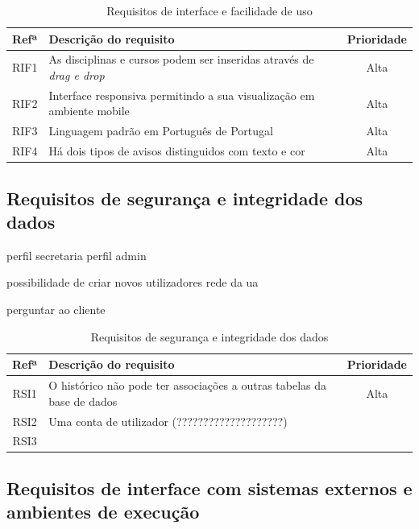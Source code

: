 \documentclass[11pt, twoside]{report}
\begin{document}
	
	\begin{table}[H]
		\caption{Requisitos de interface e facilidade de uso}
	
		\begin{center}
		\begin{tabularx}{\textwidth}{|c|X|c|}
			\hline
			\textbf{Refª }	& \textbf{Descrição do requisito} & \textbf{Prioridade} \\
			\hline
			RIF1 & As disciplinas e cursos podem ser inseridas através de \textit{drag e drop} &Alta\\
			\hline
			RIF2 & Interface responsiva permitindo a sua visualização em ambiente mobile &Alta\\
			\hline
			RIF3 & Linguagem padrão em Português de Portugal &Alta\\
			\hline
			RIF4 & Há dois tipos de avisos distinguidos com texto e cor &Alta\\
			\hline
		\end{tabularx}
		\label{requisitosdeinterface}
	\end{center}
\end{table}
	\subsection{Requisitos de segurança e integridade dos dados}
	
	perfil secretaria 
	perfil admin
	
	possibilidade de criar novos utilizadores
	rede da ua
	
	perguntar ao cliente
	\begin{table}[H]	
		\caption{Requisitos de segurança e integridade dos dados}
		
	
	\begin{center}
	\begin{tabularx}{\textwidth}{|c|X|c|}
		\hline
		\textbf{Refª }	& \textbf{Descrição do requisito} & \textbf{Prioridade} \\
		\hline
		RSI1 &O histórico não pode ter associações a outras tabelas da base de dados  &Alta\\
		\hline
		RSI2 & Uma conta de utilizador (????????????????????)&\\
		\hline
		RSI3 & &\\
		\hline
	\end{tabularx}
	\label{requisitosdeseguranca}
\end{center}
\end{table}
	
	\subsection{Requisitos de interface com sistemas externos e ambientes de execução}
	
\end{document}
